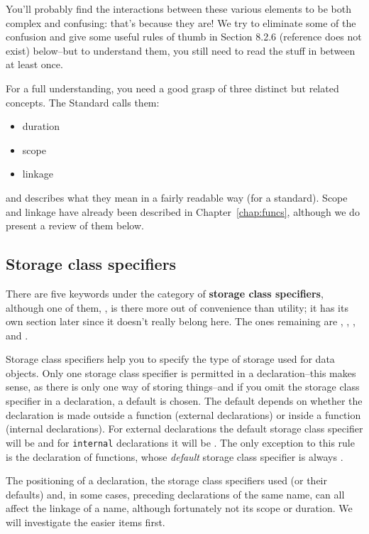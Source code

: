   You'll probably find the interactions between these various elements to
   be both complex and confusing: that's because they are! We try to
   eliminate some of the confusion and give some useful rules of thumb in
   Section 8.2.6 (reference does not exist) below--but to understand them, you still
   need to read the stuff in between at least once.


  For a full understanding, you need a good grasp of three distinct but
   related concepts. The Standard calls them:


  \begin{itemize}
   \item duration
   \item scope
   \item linkage
  \end{itemize}

  and describes what they mean in a fairly readable way (for a standard).
   Scope and linkage have already been described in Chapter~\ref{chap:funcs},
   although we do present a review of them below.


  \subsection{Storage class specifiers}
   

   There are five keywords under the category of \textbf{storage class
    specifiers}, although one of them, \typedef, is there
    more out of convenience than utility; it has its own section later since
    it doesn't really belong here. The ones remaining are \auto,
    \extern, \register, and \static.


   Storage class specifiers help you to specify the type of storage used
    for data objects. Only one storage class specifier is permitted in
    a declaration--this makes sense, as there is only one way of storing
    things--and if you omit the storage class specifier in
    a declaration, a default is chosen. The default depends on whether the
    declaration is made outside a function (external declarations) or inside
    a function (internal declarations). For external declarations the
    default storage class specifier will be \extern{} and for
    \texttt{internal} declarations it will be \auto. The
    only exception to this rule is the declaration of functions, whose
    \textit{default} storage class specifier is always
    \extern.


   The positioning of a declaration, the storage class specifiers used
    (or their defaults) and, in some cases, preceding declarations of the
    same name, can all affect the linkage of a name, although fortunately
    not its scope or duration. We will investigate the easier items
    first.


